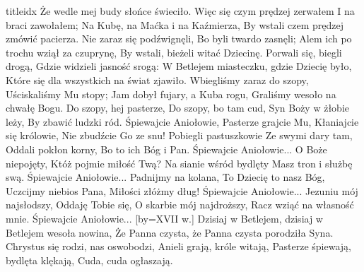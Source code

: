 \documentclass[a5paper, portrait, 12pt]{mwart}
\begin{document}
\begin{songs}{titleidx}
      Że wedle mej budy słońce świeciło.
  \endchorus
\beginverse
    Więc się czym prędzej zerwałem
    I na braci zawołałem;
\endverse
  \beginchorus
      Na Kubę, na Maćka i na Kaźmierza,
      By wstali czem prędzej zmówić pacierza.
  \endchorus
\beginverse
    Nie zaraz się podźwignęli,
    Bo byli twardo zasnęli;
\endverse
  \beginchorus
      Alem ich po trochu wziął za czuprynę,
      By wstali, bieżeli witać Dziecinę.
  \endchorus
\beginverse
    Porwali się, biegli drogą,
    Gdzie widzieli jasność srogą:
\endverse
  \beginchorus
      W Betlejem miasteczku, gdzie Dziecię było,
      Które się dla wszystkich na świat zjawiło.
  \endchorus
\beginverse
    Wbiegliśmy zaraz do szopy,
    Uściskaliśmy Mu stopy;
\endverse
  \beginchorus
      Jam dobył fujary, a Kuba rogu,
      Graliśmy wesoło na chwałę Bogu.
  \endchorus
\endsong
\beginverse
    Do szopy, hej pasterze,
    Do szopy, bo tam cud,
    Syn Boży w żłobie leży,
    By zbawić ludzki ród.
\endverse
\beginchorus
        Śpiewajcie Aniołowie,
        Pasterze grajcie Mu,
        Kłaniajcie się królowie,
        Nie zbudźcie Go ze snu!
\endchorus
\beginverse
    Pobiegli pastuszkowie
    Ze swymi dary tam,
    Oddali pokłon korny,
    Bo to ich Bóg i Pan.
\endverse
\beginchorus
        Śpiewajcie Aniołowie...
\endchorus
\beginverse
    O Boże niepojęty,
    Któż pojmie miłość Twą?
    Na sianie wśród bydlęty
    Masz tron i służbę swą.
\endverse
\beginchorus
        Śpiewajcie Aniołowie...
\endchorus
\beginverse
    Padnijmy na kolana,
    To Dziecię to nasz Bóg,
    Uczcijmy niebios Pana,
    Miłości złóżmy dług!
\endverse
\beginchorus
        Śpiewajcie Aniołowie...
\endchorus
\beginverse
    Jezuniu mój najsłodszy,
    Oddaję Tobie się,
    O skarbie mój najdroższy,
    Racz wziąć na własność mnie.
\endverse
\beginchorus
        Śpiewajcie Aniołowie...
\endchorus
\endsong
[by={XVII w.}]
\beginverse
    Dzisiaj w Betlejem, dzisiaj w Betlejem wesoła nowina,
    Że Panna czysta, że Panna czysta porodziła Syna.
\endverse
\beginchorus
    Chrystus się rodzi, nas oswobodzi,
    Anieli grają, króle witają,
    Pasterze śpiewają, bydlęta klękają,
    Cuda, cuda ogłaszają.

\end{songs}
\end{document}
